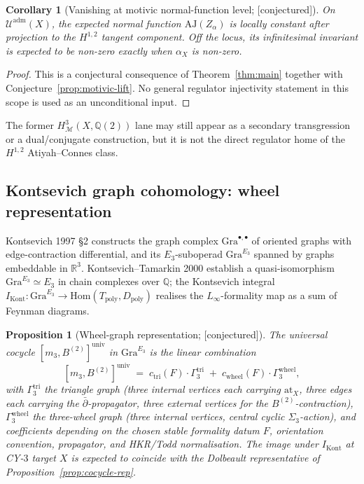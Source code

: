 \documentclass[11pt,reqno]{amsart}
\theoremstyle{plain}
\newtheorem{proposition}[theorem]{Proposition}
\newtheorem{corollary}[theorem]{Corollary}
\theoremstyle{definition}
\theoremstyle{remark}
\providecommand{\ClaimStatusConjectured}{\textnormal{[conjectured]}}
\newcommand{\Rbb}{\mathbb{R}}
\newcommand{\Qbb}{\mathbb{Q}}
\newcommand{\cM}{\mathcal{M}}
\newcommand{\cU}{\mathcal{U}}
\newcommand{\at}{\mathrm{at}}
\begin{document}
\begin{corollary}[Vanishing at motivic normal-function level; \ClaimStatusConjectured]
\label{cor:motivic-vanish}
On $\cU^{\mathrm{adm}}(X)$, the expected normal function
$\mathrm{AJ}(Z_\alpha)$ is locally constant after projection to the
$H^{1,2}$ tangent component. Off the locus, its infinitesimal invariant
is expected to be non-zero exactly when $\alpha_X$ is non-zero.
\end{corollary}

\begin{proof}
This is a conjectural consequence of Theorem~\ref{thm:main} together
with Conjecture~\ref{prop:motivic-lift}. No general regulator
injectivity statement in this scope is used as an unconditional input.
\end{proof}

The former $H^3_{\cM}(X,\Qbb(2))$ lane may still appear as a
secondary transgression or a dual/conjugate construction, but it is
not the direct regulator home of the $H^{1,2}$ Atiyah--Connes class.

\subsection{Kontsevich graph cohomology: wheel representation}
\label{sub:graph-cohomology}
Kontsevich 1997 \S2 constructs the graph complex $\mathrm{Gra}^{\bullet,\bullet}$ of oriented graphs with edge-contraction differential, and its $E_3$-suboperad $\mathrm{Gra}^{E_3}$ spanned by graphs embeddable in $\Rbb^3$. Kontsevich--Tamarkin 2000 establish a quasi-isomorphism $\mathrm{Gra}^{E_3} \simeq E_3$ in chain complexes over $\Qbb$; the Kontsevich integral $I_{\mathrm{Kont}}: \mathrm{Gra}^{E_3} \to \mathrm{Hom}(T_{\mathrm{poly}}, D_{\mathrm{poly}})$ realises the $L_\infty$-formality map as a sum of Feynman diagrams.

\begin{proposition}[Wheel-graph representation; \ClaimStatusConjectured]
\label{prop:wheel-graph}
The universal cocycle $[m_3, B^{(2)}]^{\mathrm{univ}}$ in $\mathrm{Gra}^{E_3}$ is the linear combination
\[
  [m_3, B^{(2)}]^{\mathrm{univ}} \;=\; c_{\mathrm{tri}}(F) \cdot \Gamma_3^{\mathrm{tri}} \;+\; c_{\mathrm{wheel}}(F) \cdot \Gamma_3^{\mathrm{wheel}},
\]
with $\Gamma_3^{\mathrm{tri}}$ the triangle graph (three internal
vertices each carrying $\at_X$, three edges each carrying the
$\bar\partial$-propagator, three external vertices for the
$B^{(2)}$-contraction), $\Gamma_3^{\mathrm{wheel}}$ the three-wheel
graph (three internal vertices, central cyclic $\Sigma_3$-action), and
coefficients depending on the chosen stable formality datum $F$,
orientation convention, propagator, and HKR/Todd normalisation. The
image under $I_{\mathrm{Kont}}$ at CY-$3$ target $X$ is expected to
coincide with the Dolbeault representative of
Proposition~\ref{prop:cocycle-rep}.
\end{proposition}
\end{document}
